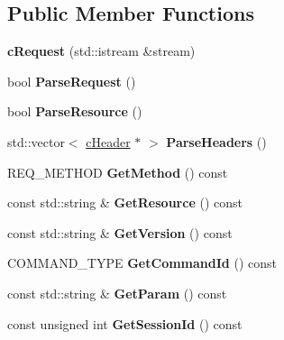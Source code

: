 \subsection*{\-Public \-Member \-Functions}
\begin{DoxyCompactItemize}
\item 
\hypertarget{classhttp__server_1_1cRequest_aa3cadbdda5c1ad42a29f182bddc94fb1}{{\bfseries c\-Request} (std\-::istream \&stream)}\label{classhttp__server_1_1cRequest_aa3cadbdda5c1ad42a29f182bddc94fb1}

\item 
\hypertarget{classhttp__server_1_1cRequest_ac9531a813f05222ee24c7a27d2ec90fd}{bool {\bfseries \-Parse\-Request} ()}\label{classhttp__server_1_1cRequest_ac9531a813f05222ee24c7a27d2ec90fd}

\item 
\hypertarget{classhttp__server_1_1cRequest_ab623c396e4dbde0253c99c0a609f275f}{bool {\bfseries \-Parse\-Resource} ()}\label{classhttp__server_1_1cRequest_ab623c396e4dbde0253c99c0a609f275f}

\item 
\hypertarget{classhttp__server_1_1cRequest_a4526de1f0c6af63f325b540fa763330b}{std\-::vector$<$ \hyperlink{classhttp__server_1_1cHeader}{c\-Header} $\ast$ $>$ {\bfseries \-Parse\-Headers} ()}\label{classhttp__server_1_1cRequest_a4526de1f0c6af63f325b540fa763330b}

\item 
\hypertarget{classhttp__server_1_1cRequest_af0c3d838c88fef758115eda75cd66835}{\-R\-E\-Q\-\_\-\-M\-E\-T\-H\-O\-D {\bfseries \-Get\-Method} () const }\label{classhttp__server_1_1cRequest_af0c3d838c88fef758115eda75cd66835}

\item 
\hypertarget{classhttp__server_1_1cRequest_a808d2f736c751db6d111d2cbb2458470}{const std\-::string \& {\bfseries \-Get\-Resource} () const }\label{classhttp__server_1_1cRequest_a808d2f736c751db6d111d2cbb2458470}

\item 
\hypertarget{classhttp__server_1_1cRequest_a9f1fbe83f22a917f75085326b96a5577}{const std\-::string \& {\bfseries \-Get\-Version} () const }\label{classhttp__server_1_1cRequest_a9f1fbe83f22a917f75085326b96a5577}

\item 
\hypertarget{classhttp__server_1_1cRequest_a51ccd6f85abf1eb131bd3e2c10ad2f59}{\-C\-O\-M\-M\-A\-N\-D\-\_\-\-T\-Y\-P\-E {\bfseries \-Get\-Command\-Id} () const }\label{classhttp__server_1_1cRequest_a51ccd6f85abf1eb131bd3e2c10ad2f59}

\item 
\hypertarget{classhttp__server_1_1cRequest_a386946841d675edc9dbf5fd81d8de046}{const std\-::string \& {\bfseries \-Get\-Param} () const }\label{classhttp__server_1_1cRequest_a386946841d675edc9dbf5fd81d8de046}

\item 
\hypertarget{classhttp__server_1_1cRequest_ada8f38975ca9bb05bfe9b5b34aa985a5}{const unsigned int {\bfseries \-Get\-Session\-Id} () const }\label{classhttp__server_1_1cRequest_ada8f38975ca9bb05bfe9b5b34aa985a5}

\end{DoxyCompactItemize}
